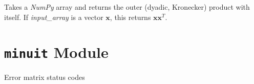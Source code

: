 \documentclass[a4paper,10pt,english]{sphinxmanual}
\begin{document}

\begin{fulllineitems}
\label{index:kafe.function_tools.outer_product}
Takes a \emph{NumPy} array and returns the outer (dyadic, Kronecker) product
with itself. If \emph{input\_array} is a vector \(\mathbf{x}\), this returns
\(\mathbf{x}\mathbf{x}^T\).

\end{fulllineitems}



\section{\texttt{minuit} Module}
\label{index:module-kafe.minuit}\label{index:minuit-module}\label{index:module-minuit}

\begin{fulllineitems}
\label{index:kafe.minuit.D_MATRIX_ERROR}
Error matrix status codes

\end{fulllineitems}

\end{document}
